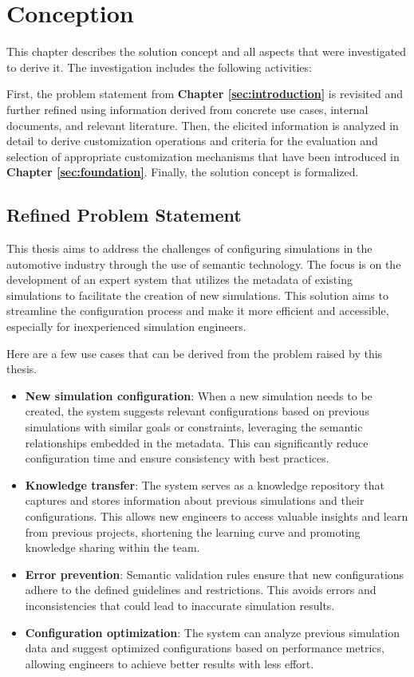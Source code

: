 \section{Conception\label{sec:conception}}

This chapter describes the solution concept and all aspects that were investigated to derive it.
The investigation includes the following activities:

First, the problem statement from \textbf{Chapter \ref{sec:introduction}} is revisited and further refined using information derived from concrete use cases, internal documents, and relevant literature.
Then, the elicited information is analyzed in detail to derive customization operations and criteria for the evaluation and selection of appropriate customization mechanisms that have been introduced in \textbf{Chapter \ref{sec:foundation}}. Finally, the solution concept is formalized.\\



\subsection{Refined Problem Statement}
This thesis aims to address the challenges of configuring simulations in the automotive industry through the use of semantic technology. The focus is on the development of an expert system that utilizes the metadata of existing simulations to facilitate the creation of new simulations. This solution aims to streamline the configuration process and make it more efficient and accessible, especially for inexperienced simulation engineers.

Here are a few use cases that can be derived from the problem raised by this thesis.

\begin{itemize}
    \item \textbf{New simulation configuration}: When a new simulation needs to be created, the system suggests relevant configurations based on previous simulations with similar goals or constraints, leveraging the semantic relationships embedded in the metadata. This can significantly reduce configuration time and ensure consistency with best practices.
    \item \textbf{Knowledge transfer}: The system serves as a knowledge repository that captures and stores information about previous simulations and their configurations. This allows new engineers to access valuable insights and learn from previous projects, shortening the learning curve and promoting knowledge sharing within the team.
    \item \textbf{Error prevention}: Semantic validation rules ensure that new configurations adhere to the defined guidelines and restrictions. This avoids errors and inconsistencies that could lead to inaccurate simulation results.
    \item \textbf{Configuration optimization}: The system can analyze previous simulation data and suggest optimized configurations based on performance metrics, allowing engineers to achieve better results with less effort.
\end{itemize}


